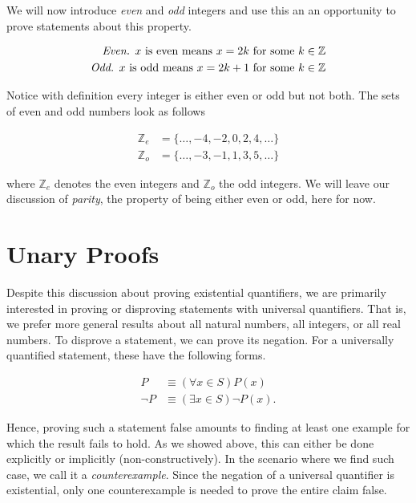 We will now introduce \emph{even} and \emph{odd} integers and use this an an opportunity to prove statements about this property.

\begin{align*}
	\emph{Even. } x \text{ is even means } x = 2k \text{ for some } k \in \mathbb{Z} \\
	\emph{Odd. }x \text{ is odd means } x = 2k + 1 \text{ for some } k \in \mathbb{Z}
\end{align*}

Notice with definition every integer is either even or odd but not both. The sets of even and odd numbers look as follows

\begin{align*}
	\mathbb{Z}_e &= \{ \dots, -4, -2, 0, 2, 4, \dots \} \\
	\mathbb{Z}_o &= \{ \dots, -3, -1, 1, 3, 5, \dots \}
\end{align*}

where $\mathbb{Z}_e$ denotes the even integers and $\mathbb{Z}_o$ the odd integers. We will leave our discussion of \emph{parity}, the property of being either even or odd, here for now.

\section{Unary Proofs}

Despite this discussion about proving existential quantifiers, we are primarily interested in proving or disproving statements with universal quantifiers. That is, we prefer more general results about all natural numbers, all integers, or all real numbers. To disprove a statement, we can prove its negation. For a universally quantified statement, these have the following forms.

\begin{align*}
	P &\equiv (\forall x \in S)P(x) \\
	\neg P &\equiv (\exists x \in S)\neg P(x).
\end{align*}

Hence, proving such a statement false amounts to finding at least one example for which the result fails to hold. As we showed above, this can either be done explicitly or implicitly (non-constructively). In the scenario where we find such case, we call it a \emph{counterexample}. Since the negation of a universal quantifier is existential, only one counterexample is needed to prove the entire claim false.


